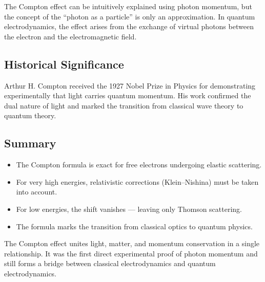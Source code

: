 \begin{DidacticBox}
	The Compton effect can be intuitively explained using photon momentum,
	but the concept of the “photon as a particle” is only an approximation.
	In quantum electrodynamics, the effect arises from the exchange of virtual photons
	between the electron and the electromagnetic field.
\end{DidacticBox}

\subsection{Historical Significance}

\begin{HistoryBox}
	Arthur H. Compton received the 1927 Nobel Prize in Physics
	for demonstrating experimentally that light carries quantum momentum.
	His work confirmed the dual nature of light and marked
	the transition from classical wave theory to quantum theory.
\end{HistoryBox}

\subsection*{Summary}

\begin{itemize}
	\item The Compton formula is exact for free electrons undergoing elastic scattering.
	\item For very high energies, relativistic corrections (Klein–Nishina) must be taken into account.
	\item For low energies, the shift vanishes — leaving only Thomson scattering.
	\item The formula marks the transition from classical optics to quantum physics.
\end{itemize}

\begin{PhysicsBox}
	The Compton effect unites light, matter, and momentum conservation in a single relationship.
	It was the first direct experimental proof of photon momentum
	and still forms a bridge between classical electrodynamics
	and quantum electrodynamics.
\end{PhysicsBox}
